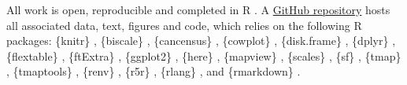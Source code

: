 \documentclass[
  authoryear,
  preprint,
  3p]{elsarticle}
\begin{document}
All work is open, reproducible and completed in R \citep{Rcore}. A
\href{https://github.com/soukhova/Care-Destinations}{GitHub repository}
hosts all associated data, text, figures and code, which relies on the
following R packages: \{knitr\} \citep{knitr1}, \{biscale\}
\citep{biscale}, \{cancensus\} \citep{cancensus}, \{cowplot\}
\citep{cowplot}, \{disk.frame\} \citep{diskframe}, \{dplyr\}
\citep{dplyr}, \{flextable\} \citep{flextable}, \{ftExtra\}
\citep{ftExtra}, \{ggplot2\} \citep{ggplot2}, \{here\} \citep{here},
\{mapview\} \citep{mapview}, \{scales\} \citep{scales}, \{sf\}
\citep{sf2}, \{tmap\} \citep{tmap}, \{tmaptools\} \citep{tmaptools},
\{renv\} \citep{renv}, \{r5r\} \citep{r5r}, \{rlang\} \citep{rlang}, and
\{rmarkdown\} \citep{rmarkdown1}.


\renewcommand\refname{References}
  
\end{document}
